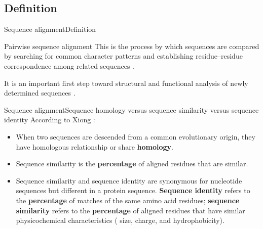 \documentclass[10pt]{beamer}
\begin{document}
{%
\subsection{Definition}

\begin{frame}{Sequence alignment}{Definition}

\begin{block}{Pairwise sequence alignment}
\centering
This is the process by which
sequences are compared by searching for common character patterns and establishing residue–residue correspondence among related sequences \cite{xiong2006essential}.
\end{block}

\begin{block}{}
\centering
 It is an important
first step toward structural and functional analysis of newly determined sequences \cite{xiong2006essential}.
\end{block}

\end{frame}


\begin{frame}{Sequence alignment}{Sequence homology versus sequence similarity versus sequence identity}
According to Xiong \cite{xiong2006essential}:
\begin{itemize}
    \item When two sequences are descended from a common evolutionary origin, they have 
homologous relationship or share \textbf{homology}.
    \item Sequence similarity is the \textbf{percentage} of aligned residues that are similar.
    \item Sequence similarity and sequence identity are synonymous for nucleotide sequences but different in a protein sequence. \textbf{Sequence identity} refers to the \textbf{percentage} of matches of the same amino acid residues; \textbf{sequence similarity} refers to the \textbf{percentage} of aligned residues that have similar physicochemical characteristics ( size, charge, and hydrophobicity).


\end{itemize}
\end{frame}}
\end{document}
